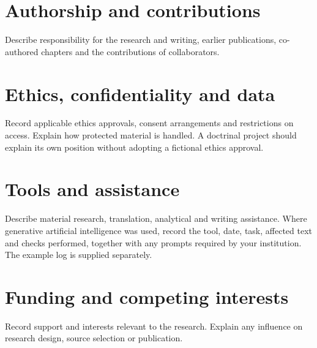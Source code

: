 \section*{Authorship and contributions}
Describe responsibility for the research and writing, earlier publications,
co-authored chapters and the contributions of collaborators.
\section*{Ethics, confidentiality and data}
Record applicable ethics approvals, consent arrangements and restrictions on
access. Explain how protected material is handled. A doctrinal project should
explain its own position without adopting a fictional ethics approval.
\section*{Tools and assistance}
Describe material research, translation, analytical and writing assistance.
Where generative artificial intelligence was used, record the tool, date,
task, affected text and checks performed, together with any prompts required
by your institution. The example log is supplied separately.
\section*{Funding and competing interests}
Record support and interests relevant to the research. Explain any influence
on research design, source selection or publication.
